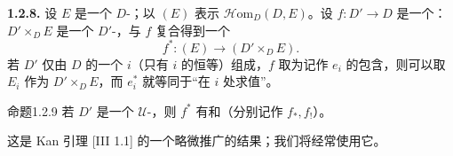 \textbf{1.2.8.} 设 $E$ 是一个 $D$-；以 $(E)$ 表示 $\mathscr{H}\mathrm{om}_D(D,E)$。设 $f:D'\to D$ 是一个： $D'\times_D E$ 是一个 $D'$-，与 $f$ 复合得到一个
\[
f^*:(E)\longrightarrow(D'\times_D E).
\]
若 $D'$ 仅由 $D$ 的一个 $i$（只有 $i$ 的恒等）组成，$f$ 取为记作 $e_i$ 的包含，则可以取 $E_i$ 作为 $D'\times_D E$，而 $e_i^*$ 就等同于“在 $i$ 处求值”。

\begin{SGAresult}{命题}{1.2.9}
若 $D'$ 是一个 $\mathcal U$-，则 $f^*$ 有和（分别记作 $f_*,f_!$）。
\end{SGAresult}
这是 Kan 引理 [III 1.1] 的一个略微推广的结果；我们将经常使用它。

